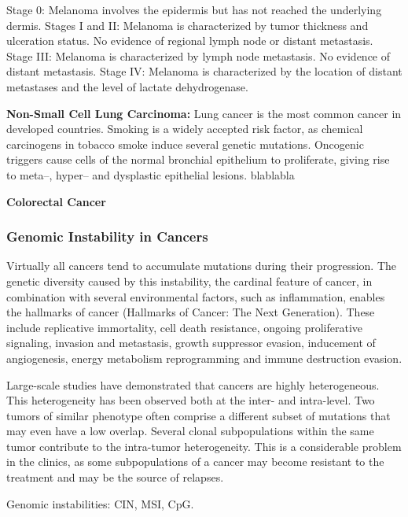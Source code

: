     Stage 0: Melanoma involves the epidermis but has not reached the underlying dermis.
    Stages I and II: Melanoma is characterized by tumor thickness and ulceration status. No evidence of regional lymph node or distant metastasis.
    Stage III: Melanoma is characterized by lymph node metastasis. No evidence of distant metastasis.
    Stage IV: Melanoma is characterized by the location of distant metastases and the level of lactate dehydrogenase.


    \textbf{Non-Small Cell Lung Carcinoma:} Lung cancer is the most common
    cancer in developed countries. Smoking is a widely accepted risk factor, as
    chemical carcinogens in tobacco smoke induce several genetic mutations.
    Oncogenic triggers cause cells of the normal bronchial epithelium to
    proliferate, giving rise to meta--, hyper-- and dysplastic epithelial
    lesions. blablabla


    \textbf{Colorectal Cancer}

    \subsubsection{Genomic Instability in Cancers}

      Virtually all cancers tend to accumulate mutations during their progression.
      The genetic diversity caused by this instability, the cardinal feature of
      cancer, in combination with several environmental factors, such as
      inflammation, enables the hallmarks of cancer (Hallmarks of Cancer: The Next
      Generation). These include replicative immortality, cell death resistance,
      ongoing proliferative signaling, invasion and metastasis, growth suppressor
      evasion, inducement of angiogenesis, energy metabolism reprogramming and
      immune destruction evasion.

      Large-scale studies have demonstrated that cancers are highly heterogeneous.
      This heterogeneity has been observed both at the inter- and intra-level. Two
      tumors of similar phenotype often comprise a different subset of mutations
      that may even have a low overlap. Several clonal subpopulations within the
      same tumor contribute to the intra-tumor heterogeneity. This is a
      considerable problem in the clinics, as some subpopulations of a cancer may
      become resistant to the  treatment and may be the source of relapses.

      Genomic instabilities: CIN, MSI, CpG.

